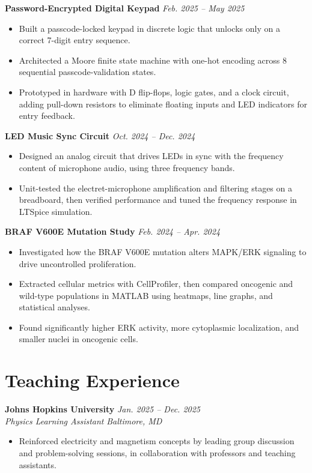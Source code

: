 \documentclass[10.5pt,letterpaper]{article}
\newcommand{\tightlist}{\vspace{-9pt}}
\newcommand{\jobhead}[4]{%
  \noindent\textbf{#1} \hfill \textit{#2}\\
  \noindent\textit{#3} \hfill \textit{#4}\\[-0.15em]
}
\newcommand{\projhead}[2]{%
  \noindent\textbf{#1} \hfill \textit{#2}\\[-0.15em]
}
\begin{document}
\projhead{Password-Encrypted Digital Keypad}{Feb. 2025 -- May 2025}
\tightlist
\begin{itemize}
  \item Built a passcode-locked keypad in discrete logic that unlocks only on a correct 7-digit entry sequence.
  \item Architected a Moore finite state machine with one-hot encoding across 8 sequential passcode-validation states.
  \item Prototyped in hardware with D flip-flops, logic gates, and a clock circuit, adding pull-down resistors to eliminate floating inputs and LED indicators for entry feedback.
\end{itemize}

\projhead{LED Music Sync Circuit}{Oct. 2024 -- Dec. 2024}
\tightlist
\begin{itemize}
  \item Designed an analog circuit that drives LEDs in sync with the frequency content of microphone audio, using three frequency bands.
  \item Unit-tested the electret-microphone amplification and filtering stages on a breadboard, then verified performance and tuned the frequency response in LTSpice simulation.
\end{itemize}

\projhead{BRAF V600E Mutation Study}{Feb. 2024 -- Apr. 2024}
\tightlist
\begin{itemize}
  \item Investigated how the BRAF V600E mutation alters MAPK/ERK signaling to drive uncontrolled proliferation.
  \item Extracted cellular metrics with CellProfiler, then compared oncogenic and wild-type populations in MATLAB using heatmaps, line graphs, and statistical analyses.
  \item Found significantly higher ERK activity, more cytoplasmic localization, and smaller nuclei in oncogenic cells.
\end{itemize}

\section{Teaching Experience}

\jobhead{Johns Hopkins University}{Jan. 2025 -- Dec. 2025}{Physics Learning Assistant}{Baltimore, MD}
\tightlist
\begin{itemize}
  \item Reinforced electricity and magnetism concepts by leading group discussion and problem-solving sessions, in collaboration with professors and teaching assistants.
\end{itemize}
\end{document}
